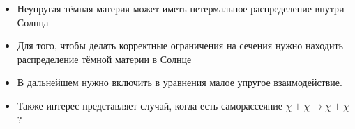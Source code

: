 \begin{itemize}
	\item Неупругая тёмная материя может иметь нетермальное распределение внутри Солнца
	\item Для того, чтобы делать корректные ограничения на сечения нужно находить распределение тёмной материи в Солнце
	\item В дальнейшем нужно включить в уравнения малое упругое взаимодействие.
	\item Также интерес представляет случай, когда есть саморассеяние $\chi + \chi \rightarrow \chi + \chi$?
	
\end{itemize}